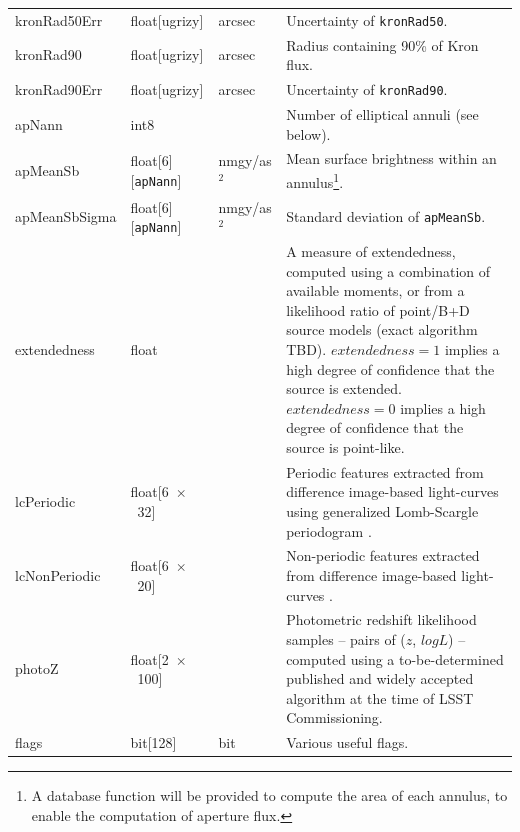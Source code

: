 \documentclass[12pt]{article}
\newcommand\x         {\hbox{$\times$}}
\begin{document}
\begin{center}
\begin{longtable}{p{3cm}p{2cm}p{2cm}p{5cm}}
kronRad50Err & float[ugrizy] & arcsec & Uncertainty of \texttt{kronRad50}. \\

kronRad90 & float[ugrizy] & arcsec & Radius containing 90\% of Kron flux. \\

kronRad90Err & float[ugrizy] & arcsec & Uncertainty of \texttt{kronRad90}. \\


apNann & int8 & ~ & Number of elliptical annuli (see below). \\

apMeanSb & float[6][\texttt{apNann}] & nmgy/as$^2$ & Mean surface brightness within an annulus\footnote{A database function will be provided to compute the area of each annulus, to enable the computation of aperture flux.}. \\

apMeanSbSigma & float[6][\texttt{apNann}] & nmgy/as$^2$ & Standard deviation of \texttt{apMeanSb}. \\

extendedness & float & ~ & A measure of extendedness, computed using a combination of available moments, or from a likelihood ratio of point/B+D source models (exact algorithm TBD). $extendedness=1$ implies a high degree of confidence that the source is extended. $extendedness=0$ implies a high degree of confidence that the source is point-like. \\

lcPeriodic & float[6~\x~32] & ~ & Periodic features extracted from difference image-based light-curves using generalized Lomb-Scargle periodogram \citep[Table~4,][]{2011ApJ...733...10R}.\\

lcNonPeriodic & float[6~\x~20] & ~ & Non-periodic features extracted from difference image-based light-curves \citep[Table~5,][]{2011ApJ...733...10R}. \\

photoZ & float[2~\x~100] & ~ & Photometric redshift likelihood samples -- pairs of ($z$, $logL$) -- computed using a to-be-determined published and widely accepted algorithm at the time of LSST Commissioning. \\

flags & bit[128] & bit & Various useful flags. \\ \hline
\end{longtable}
\end{center}
\end{document}
